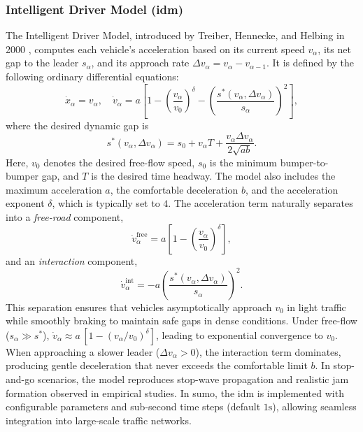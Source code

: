 \subsubsection{Intelligent Driver Model (\acs{idm})}
\label{subsubsec:idm}
The Intelligent Driver Model, introduced by Treiber, Hennecke, and Helbing in 2000 \cite{Treiber_2000}, computes each vehicle’s acceleration based on its current speed $v_\alpha$, its net gap to the leader $s_\alpha$, and its approach rate $\Delta v_\alpha = v_\alpha - v_{\alpha-1}$. It is defined by the following ordinary differential equations:
\begin{equation}
    \dot{x}_\alpha = v_\alpha,
    \quad
    \dot{v}_\alpha = a\left[1 - \left(\frac{v_\alpha}{v_0}\right)^\delta - \left(\frac{s^*(v_\alpha,\Delta v_\alpha)}{s_\alpha}\right)^2\right],
\end{equation}
where the desired dynamic gap is
\begin{equation}
    s^*(v_\alpha,\Delta v_\alpha) = s_0 + v_\alpha T + \frac{v_\alpha \Delta v_\alpha}{2\sqrt{ab}}.
\end{equation}
Here, $v_0$ denotes the desired free-flow speed, $s_0$ is the minimum bumper-to-bumper gap, and $T$ is the desired time headway. The model also includes the maximum acceleration $a$, the comfortable deceleration $b$, and the acceleration exponent $\delta$, which is typically set to $4$. 
\mynewline
The acceleration term naturally separates into a \textit{free-road} component,
\begin{equation}
    \dot{v}^\mathrm{free}_\alpha = a\left[1 - \left(\frac{v_\alpha}{v_0}\right)^\delta\right],
\end{equation}
and an \textit{interaction} component,
\begin{equation}
    \dot{v}^\mathrm{int}_\alpha = -a\left(\frac{s^*(v_\alpha,\Delta v_\alpha)}{s_\alpha}\right)^2.
\end{equation}
This separation ensures that vehicles asymptotically approach $v_0$ in light traffic while smoothly braking to maintain safe gaps in dense conditions.
\mynewline
Under free-flow ($s_\alpha\gg s^*$), $\dot{v}_\alpha\approx a\,[1-(v_\alpha/v_0)^\delta]$, leading to exponential convergence to $v_0$. When approaching a slower leader ($\Delta v_\alpha>0$), the interaction term dominates, producing gentle deceleration that never exceeds the comfortable limit $b$. In stop-and-go scenarios, the model reproduces stop-wave propagation and realistic jam formation observed in empirical studies. \cite{Treiber_2000} In \ac{sumo}, the \ac{idm} is implemented with configurable parameters and sub-second time steps (default $1\unit{\second}$), allowing seamless integration into large-scale traffic networks. \cite{Krajzewicz2002}
